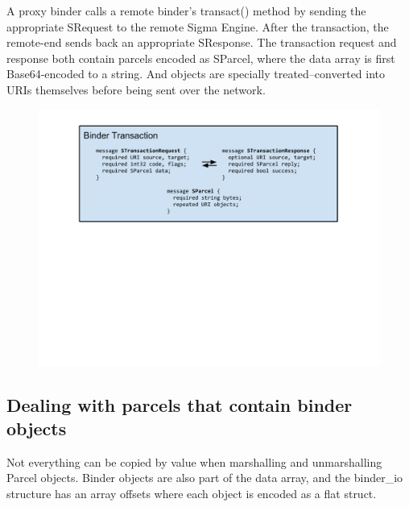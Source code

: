 \documentclass[prodmode]{acmlarge}
\begin{document}
A proxy binder calls a remote binder's transact() method by sending the appropriate SRequest to the remote Sigma Engine. After the transaction, the remote-end sends back an appropriate SResponse. The transaction request and response both contain parcels encoded as SParcel, where the data array is first Base64-encoded to a string. And objects are specially treated--converted into URIs themselves before being sent over the network.
\begin{figure}[h]
\centering
\includegraphics[width=\columnwidth]{drawings/WireBinderTransaction.pdf}
\end{figure}


\subsection{Dealing with parcels that contain binder objects}
Not everything can be copied by value when marshalling and unmarshalling Parcel objects. Binder objects are also part of the data array, and the binder\_io structure has an array offsets where each object is encoded as a flat struct.
\end{document}
